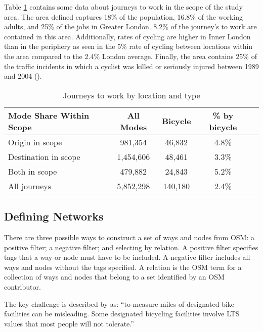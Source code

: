 Table \ref{table:commute_data} contains some data about journeys to work in the scope of the study area. The area defined captures 18\% of the population, 16.8\% of the working adults, and 25\% of the jobs in Greater London. 8.2\% of the journey's to work are contained in this area. Additionally, rates of cycling are higher in Inner London than in the periphery as seen in the 5\% rate of cycling between locations within the area compared to the 2.4\% London average. Finally, the area contains 25\% of the traffic incidents in which a cyclist was killed or seriously injured between 1989 and 2004 (\cite{cyclistksi}). 
 
\begin{table}[]
\centering
\begin{tabular}{lcccl}
 Mode Share Within Scope & All Modes & Bicycle & \% by bicycle &  \\
 \hline
 Origin in scope &  981,354 & 46,832 & 4.8\% &  \\
 Destination in scope & 1,454,606 & 48,461 & 3.3\% &  \\
 Both in scope & 479,882 & 24,843 & 5.2\% & \\
 All journeys & 5,852,298 & 140,180 & 2.4\% \\ 
\end{tabular}
\caption{Journeys to work by location and type}
\label{table:commute_data}
\end{table}

\subsection{Defining Networks}

There are three possible ways to construct a set of ways and nodes from OSM: a positive filter; a negative filter; and selecting by relation. A positive filter specifies tags that a way or node must have to be included. A negative filter includes all ways and nodes without the tags specified. A relation is the OSM term for a collection of ways and nodes that belong to a set identified by an OSM contributor. 

The key challenge is described by \textcite{furth2016network} as: ``to measure miles of designated bike facilities can be misleading. Some designated bicycling facilities involve LTS values that most people will not tolerate.''

